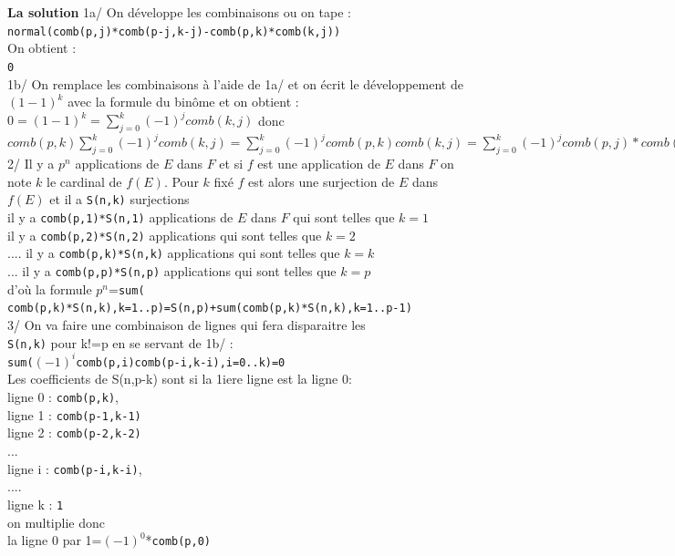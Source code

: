 \documentclass[a4paper,11pt]{book}
\begin{document}
{\bf La solution}
1a/  On d\'eveloppe les combinaisons ou on tape :\\
{\tt normal(comb(p,j)*comb(p-j,k-j)-comb(p,k)*comb(k,j))}\\
On obtient :\\
{\tt 0}\\
1b/ On remplace les combinaisons \`a l'aide de 1a/ et on \'ecrit le 
d\'eveloppement de $(1-1)^k$ avec la formule du bin\^ome et on obtient :\\
$0=(1-1)^k=\sum_{j=0}^k(-1)^jcomb(k,j)$ donc\\
$comb(p,k)\sum_{j=0}^k(-1)^jcomb(k,j)=\sum_{j=0}^k(-1)^jcomb(p,k)comb(k,j)=\sum_{j=0}^k(-1)^jcomb(p,j)*comb(p-j,k-j)$\\
2/ Il y a $p^n$ applications de $E$ dans $F$ et si $f$ est une application de 
$E$ dans $F$ on note $k$ le cardinal de $f(E)$.  Pour $k$ fix\'e $f$ est alors 
une surjection de $E$ dans $f(E)$ et il a {\tt S(n,k)} surjections\\
il y a {\tt comb(p,1)*S(n,1)} applications de $E$ dans $F$ qui sont telles que 
$k=1$ \\
il y a {\tt comb(p,2)*S(n,2)} applications qui sont telles que $k=2$ \\
....
il y a {\tt comb(p,k)*S(n,k)} applications qui sont telles que $k=k$\\
...
il y a {\tt comb(p,p)*S(n,p)} applications qui sont telles que $k=p$\\
d'o\`u la formule
$p^n$={\tt sum( comb(p,k)*S(n,k),k=1..p)=S(n,p)+sum(comb(p,k)*S(n,k),k=1..p-1)}  \\
3/ On va faire une combinaison de lignes qui fera disparaitre les \\
{\tt S(n,k)} pour k!=p en se servant de 1b/ :\\
{\tt sum($(-1)^i$comb(p,i)comb(p-i,k-i),i=0..k)=0}\\
Les coefficients de S(n,p-k) sont si la 1iere ligne est la ligne 0:\\
ligne 0  : {\tt comb(p,k)},\\
ligne 1  : {\tt comb(p-1,k-1)}\\
ligne 2  : {\tt comb(p-2,k-2)}\\
...\\
ligne i  : {\tt comb(p-i,k-i)},\\
....\\
ligne k : {\tt 1}\\
on multiplie donc  \\
la ligne 0 par 1=$(-1)^0$*{\tt comb(p,0)} \\
\end{document}

